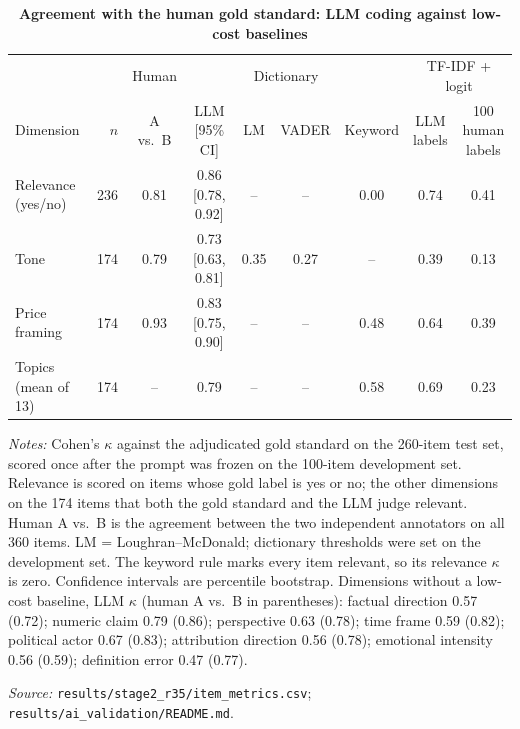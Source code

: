 \begin{table}[htbp]
\centering
\begin{threeparttable}
\caption{\textbf{Agreement with the human gold standard: LLM coding against low-cost baselines}}
\label{tab:ai}
\footnotesize
\begin{tabular}{@{}l r c c c c c c c@{}}
\toprule
 & & Human & & \multicolumn{2}{c}{Dictionary} & & \multicolumn{2}{c}{TF-IDF + logit} \\
\cmidrule(lr){5-6}\cmidrule(l){8-9}
Dimension & $n$ & A vs.\ B & LLM [95\% CI] & LM & VADER & Keyword & \makecell{LLM\\labels} & \makecell{100 human\\labels} \\
\midrule
Relevance (yes/no) & 236 & 0.81 & 0.86 [0.78, 0.92] & -- & -- & 0.00 & 0.74 & 0.41 \\
Tone & 174 & 0.79 & 0.73 [0.63, 0.81] & 0.35 & 0.27 & -- & 0.39 & 0.13 \\
Price framing & 174 & 0.93 & 0.83 [0.75, 0.90] & -- & -- & 0.48 & 0.64 & 0.39 \\
Topics (mean of 13) & 174 & -- & 0.79 & -- & -- & 0.58 & 0.69 & 0.23 \\
\bottomrule
\end{tabular}
\begin{tablenotes}[flushleft]\footnotesize
\item \textit{Notes:} Cohen's $\kappa$ against the adjudicated gold standard on the 260-item test set, scored once after the prompt was frozen on the 100-item development set. Relevance is scored on items whose gold label is yes or no; the other dimensions on the 174 items that both the gold standard and the LLM judge relevant. Human A vs.\ B is the agreement between the two independent annotators on all 360 items. LM = Loughran--McDonald; dictionary thresholds were set on the development set. The keyword rule marks every item relevant, so its relevance $\kappa$ is zero. Confidence intervals are percentile bootstrap. Dimensions without a low-cost baseline, LLM $\kappa$ (human A vs.\ B in parentheses): factual direction 0.57 (0.72); numeric claim 0.79 (0.86); perspective 0.63 (0.78); time frame 0.59 (0.82); political actor 0.67 (0.83); attribution direction 0.56 (0.78); emotional intensity 0.56 (0.59); definition error 0.47 (0.77).
\item \textit{Source:} \texttt{results/stage2\_r35/item\_metrics.csv}; \texttt{results/ai\_validation/README.md}.
\end{tablenotes}
\end{threeparttable}
\end{table}
